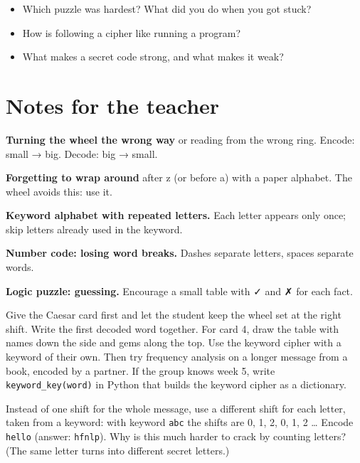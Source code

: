\begin{reflection}
\begin{itemize}[leftmargin=1.2em]
  \item Which puzzle was hardest? What did you do when you got stuck?
  \item How is following a cipher like running a program?
  \item What makes a secret code strong, and what makes it weak?
\end{itemize}
\end{reflection}

\section{Notes for the teacher}
\begin{commonmistakes}
  \item \textbf{Turning the wheel the wrong way} or reading from the wrong ring. Encode: small → big. Decode: big → small.
  \item \textbf{Forgetting to wrap around} after z (or before a) with a paper alphabet. The wheel avoids this: use it.
  \item \textbf{Keyword alphabet with repeated letters.} Each letter appears only once; skip letters already used in the keyword.
  \item \textbf{Number code: losing word breaks.} Dashes separate letters, spaces separate words.
  \item \textbf{Logic puzzle: guessing.} Encourage a small table with ✓ and ✗ for each fact.
\end{commonmistakes}

\begin{differentiation}
\supportpath Give the Caesar card first and let the student keep the wheel set at the right shift. Write the first decoded word together.
For card 4, draw the table with names down the side and gems along the top.
\extensionpath Use the keyword cipher with a keyword of their own. Then try frequency analysis on a longer message from a book, encoded by a partner.
If the group knows week 5, write \texttt{keyword\_key(word)} in Python that builds the keyword cipher as a dictionary.
\end{differentiation}

\begin{stretchchallenge}
Instead of one shift for the whole message, use a different shift for each letter, taken from a keyword: with keyword \texttt{abc}
the shifts are 0, 1, 2, 0, 1, 2 \ldots{} Encode \texttt{hello} (answer: \texttt{hfnlp}). Why is this much harder to crack by counting letters?
(The same letter turns into different secret letters.)
\end{stretchchallenge}

